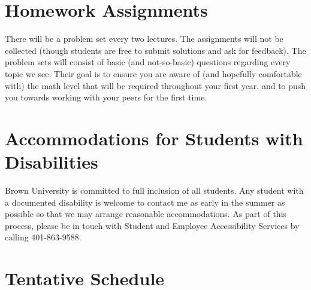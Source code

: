 \documentclass[11pt]{article}
\begin{document}
\section{Homework Assignments}
\label{sec:homework_assignments}

There will be a problem set every two lectures. The assignments will not be collected (though students are free to submit solutions and ask for feedback). The problem sets will consist of basic (and not-so-basic) questions regarding every topic we see. Their goal is to ensure you are aware of (and hopefully comfortable with) the math level that will be required throughout your first year, and to push you towards working with your peers for the first time.

\section{Accommodations for Students with Disabilities}
\label{sec:accommodations_for_students_with_disabilities}

Brown University is committed to full inclusion of all students. Any student with a documented disability is welcome to contact me as early in the summer as possible so that we may arrange reasonable accommodations. As part of this process, please be in touch with Student and Employee Accessibility Services by calling 401-863-9588.

\section{Tentative Schedule}
\label{sec:tentative_schedule}
\end{document}
